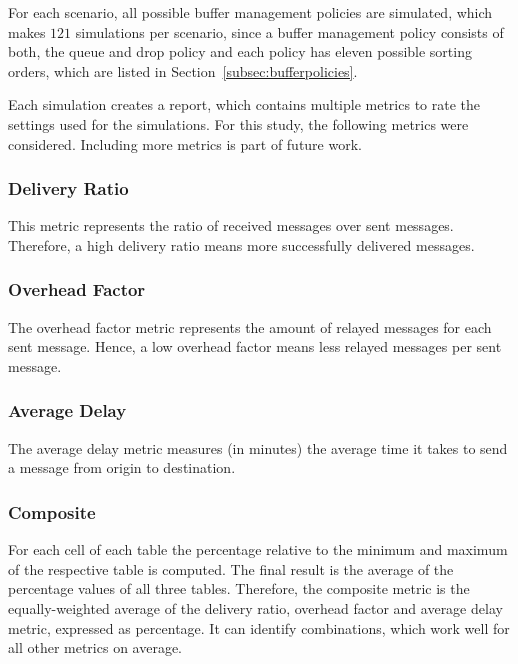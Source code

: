 \documentclass[conference,10pt,letterpaper,final]{IEEEtran}
\begin{document}
For each scenario, all possible buffer management policies are simulated, which makes $121$ simulations per scenario, since a buffer management policy consists of both, the queue and drop policy and each policy has eleven possible sorting orders, which are listed in Section~\ref{subsec:bufferpolicies}.

Each simulation creates a report, which contains multiple metrics to rate the settings used for the simulations.
For this study, the following metrics were considered.
Including more metrics is part of future work.
\vspace{0.2cm}

\subsubsection{Delivery Ratio}
This metric represents the ratio of received messages over sent messages.
Therefore, a high delivery ratio means more successfully delivered messages.
\vspace{0.2cm}

\subsubsection{Overhead Factor}
The overhead factor metric represents the amount of relayed messages for each sent message.
Hence, a low overhead factor means less relayed messages per sent message.
\vspace{0.2cm}

\subsubsection{Average Delay}
The average delay metric measures (in minutes) the average time it takes to send a message from origin to destination.
\vspace{0.2cm}

\subsubsection{Composite}
For each cell of each table the percentage relative to the minimum and maximum of the respective table is computed.
The final result is the average of the percentage values of all three tables.
Therefore, the composite metric is the equally-weighted average of the delivery ratio, overhead factor and average delay metric, expressed as percentage.
It can identify combinations, which work well for all other metrics on average.
\vspace{0.2cm}
\end{document}

